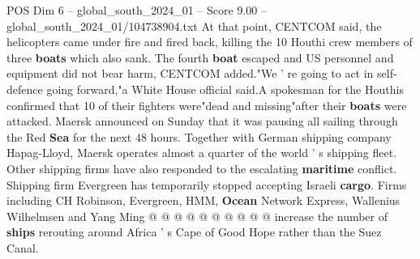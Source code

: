 \begin{textsample}{POS Dim 6 – global\_south\_2024\_01 – Score 9.00 – global\_south\_2024\_01/104738904.txt}
At that point, CENTCOM said, the helicopters came under fire and fired back, killing the 10 Houthi crew members of three \textbf{boats} which also sank.
The fourth \textbf{boat} escaped and US personnel and equipment did not bear harm, CENTCOM added."We ' re going to act in self-defence going forward,"a White House official said.A spokesman for the Houthis confirmed that 10 of their fighters were"dead and missing"after their \textbf{boats} were attacked.
Maersk announced on Sunday that it was pausing all sailing through the Red \textbf{Sea} for the next 48 hours.
Together with German shipping company Hapag-Lloyd, Maersk operates almost a quarter of the world ' s shipping fleet.
Other shipping firms have also responded to the escalating \textbf{maritime} conflict.
Shipping firm Evergreen has temporarily stopped accepting Israeli \textbf{cargo}.
Firms including CH Robinson, Evergreen, HMM, \textbf{Ocean} Network Express, Wallenius Wilhelmsen and Yang Ming @ @ @ @ @ @ @ @ @ @ increase the number of \textbf{ships} rerouting around Africa ' s Cape of Good Hope rather than the Suez Canal.

\end{textsample}

